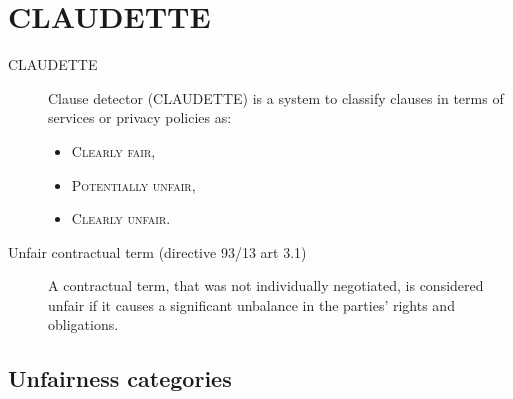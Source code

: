 \chapter{CLAUDETTE}

\begin{description}
    \item[CLAUDETTE] 
        Clause detector (CLAUDETTE) is a system to classify clauses in terms of services or privacy policies as:
        \begin{itemize}
            \item \textsc{Clearly fair},
            \item \textsc{Potentially unfair},
            \item \textsc{Clearly unfair}.
        \end{itemize}

    \item[Unfair contractual term (directive 93/13 art 3.1)] 
        A contractual term, that was not individually negotiated, is considered unfair if it causes a significant unbalance in the parties' rights and obligations.
\end{description}


\section{Unfairness categories}


